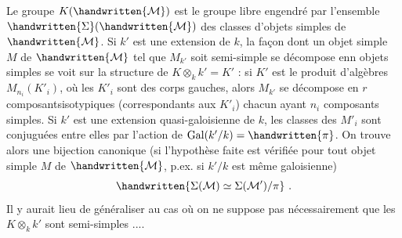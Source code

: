 Le groupe $K(\handwritten{\mathcal{M}})$ est le groupe libre engendré par l'ensemble $\handwritten{\Sigma}(\handwritten{\mathcal{M}})$ des classes d'objets simples de $\handwritten{\mathcal{M}}$. Si $k'$ est une extension de $k$, la façon dont un objet simple $M$ de $\handwritten{\mathcal{M}}$ tel que $M_{k'}$ soit semi-simple se décompose enn objets simples se voit sur la structure de $K\otimes_k k'=K'$ : si $K'$ est le produit d'algèbres $M_{n_i}(K'_i)$, où les $K'_i$ sont des corps gauches, alors $M_{k'}$ se décompose en $r$ composantsisotypiques (correspondants aux $K'_i$) chacun ayant $n_i$ composants simples. Si $k'$ est une extension quasi-galoisienne de $k$, les classes des $M'_i$ sont conjuguées entre elles par l'action de $\operatorname{Gal}(k'/k)=\handwritten{\pi}$. On trouve alors une bijection canonique (si l'hypothèse faite est vérifiée pour tout objet simple  $M$ de $\handwritten{\mathcal{M}}$, p.ex. si $k'/k$ est même galoisienne)
\[
\handwritten{\Sigma(\mathcal{M})\simeq\Sigma(\mathcal{M}')/\pi}\ .
\]
Il y aurait lieu de généraliser au cas où on ne suppose pas nécessairement que les $K\otimes_k k'$ sont semi-simples ....

